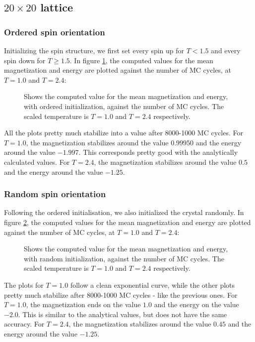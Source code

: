 \documentclass[../main.tex]{subfiles}
\begin{document}
\subsection{$20 \times 20$ lattice} \label{sec:results-20x20lattice}
\subsubsection*{Ordered spin orientation}
Initializing the spin structure, we first set every spin up for $T<1.5$ and every spin down for $T\ge 1.5$. In figure \ref{fig:ordered}, the computed values for the mean magnetization and energy are plotted against the number of MC cycles, at $T=1.0$ and $T=2.4$:

\begin{figure}[!h]
  \centering
  \caption{Shows the computed value for the mean magnetization and energy, with ordered initialization, against the number of MC cycles. The scaled temperature is $T=1.0$ and $T=2.4$ respectively.}
  \label{fig:ordered}
\end{figure}
\FloatBarrier
All the plots pretty much stabilize into a value after 8000-1000 MC cycles. For $T=1.0$, the magnetization stabilizes around the value $0.99950$ and the energy around the value $-1.997$. This corresponds pretty good with the analytically calculated values. For $T=2.4$, the magnetization stabilizes around the value $0.5$ and the energy around the value $-1.25$.

\subsubsection*{Random spin orientation}
Following the ordered initialisation, we also initialized the crystal randomly. In figure \ref{fig:random}, the computed values for the mean magnetization and energy are plotted against the number of MC cycles, at $T=1.0$ and $T=2.4$:

\begin{figure}[!h]
  \centering
  \caption{Shows the computed value for the mean magnetization and energy, with random initialization, against the number of MC cycles. The scaled temperature is $T=1.0$ and $T=2.4$ respectively.}
  \label{fig:random}
\end{figure}
\FloatBarrier
The plots for $T=1.0$ follow a clean exponential curve, while the other plots pretty much stabilize after 8000-1000 MC cycles - like the previous ones. For $T=1.0$, the magnetization ends on the value $1.0$ and the energy on the value $-2.0$. This is similar to the analytical values, but does not have the same accuracy. For $T=2.4$, the magnetization stabilizes around the value $0.45$ and the energy around the value $-1.25$.
\end{document}
